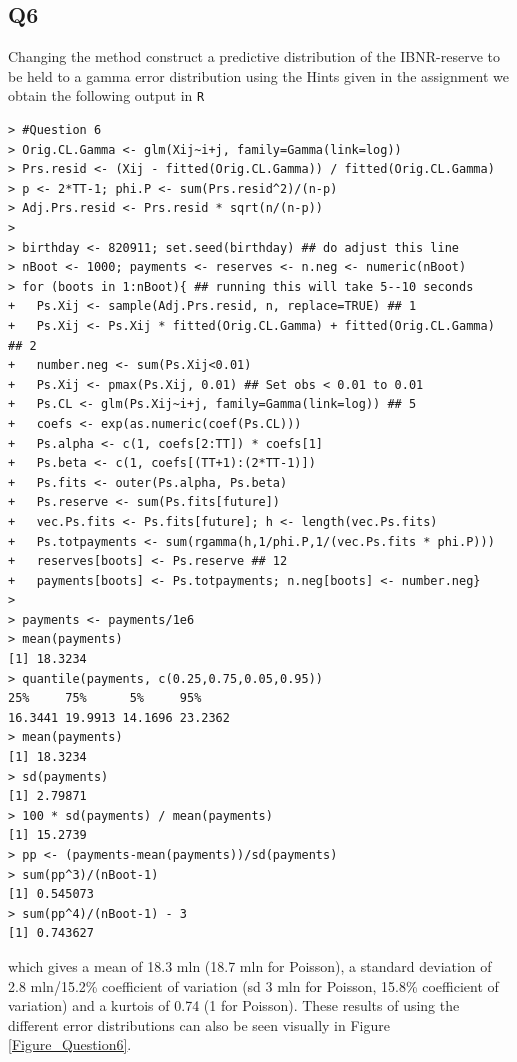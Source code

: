 \documentclass[11pt]{article}
\begin{document}
\subsection*{Q6}
Changing the method construct a predictive distribution of the IBNR-reserve to be held to a gamma error distribution using the Hints given in the assignment we obtain the following output in \verb|R|

\begin{verbatim}
> #Question 6
> Orig.CL.Gamma <- glm(Xij~i+j, family=Gamma(link=log))
> Prs.resid <- (Xij - fitted(Orig.CL.Gamma)) / fitted(Orig.CL.Gamma)
> p <- 2*TT-1; phi.P <- sum(Prs.resid^2)/(n-p)
> Adj.Prs.resid <- Prs.resid * sqrt(n/(n-p))
> 
> birthday <- 820911; set.seed(birthday) ## do adjust this line
> nBoot <- 1000; payments <- reserves <- n.neg <- numeric(nBoot)
> for (boots in 1:nBoot){ ## running this will take 5--10 seconds
+   Ps.Xij <- sample(Adj.Prs.resid, n, replace=TRUE) ## 1
+   Ps.Xij <- Ps.Xij * fitted(Orig.CL.Gamma) + fitted(Orig.CL.Gamma) ## 2
+   number.neg <- sum(Ps.Xij<0.01)
+   Ps.Xij <- pmax(Ps.Xij, 0.01) ## Set obs < 0.01 to 0.01
+   Ps.CL <- glm(Ps.Xij~i+j, family=Gamma(link=log)) ## 5
+   coefs <- exp(as.numeric(coef(Ps.CL)))
+   Ps.alpha <- c(1, coefs[2:TT]) * coefs[1]
+   Ps.beta <- c(1, coefs[(TT+1):(2*TT-1)])
+   Ps.fits <- outer(Ps.alpha, Ps.beta)
+   Ps.reserve <- sum(Ps.fits[future])
+   vec.Ps.fits <- Ps.fits[future]; h <- length(vec.Ps.fits)
+   Ps.totpayments <- sum(rgamma(h,1/phi.P,1/(vec.Ps.fits * phi.P)))
+   reserves[boots] <- Ps.reserve ## 12
+   payments[boots] <- Ps.totpayments; n.neg[boots] <- number.neg}
> 
> payments <- payments/1e6
> mean(payments)
[1] 18.3234
> quantile(payments, c(0.25,0.75,0.05,0.95))
25%     75%      5%     95% 
16.3441 19.9913 14.1696 23.2362 
> mean(payments)
[1] 18.3234
> sd(payments) 
[1] 2.79871
> 100 * sd(payments) / mean(payments) 
[1] 15.2739
> pp <- (payments-mean(payments))/sd(payments)
> sum(pp^3)/(nBoot-1)
[1] 0.545073
> sum(pp^4)/(nBoot-1) - 3
[1] 0.743627
\end{verbatim}

which gives a mean of 18.3 mln (18.7 mln for Poisson), a standard deviation of 2.8 mln/15.2\% coefficient of variation (sd 3 mln for Poisson, 15.8\% coefficient of variation) and a kurtois of 0.74 (1 for Poisson). These results of using the different error distributions can also be seen visually in Figure \ref{Figure_Question6}.
\end{document}
